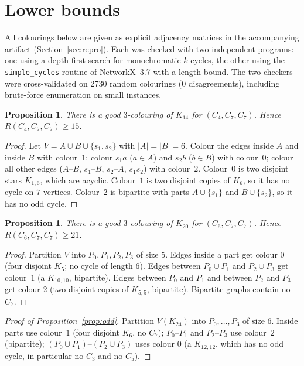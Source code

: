 \documentclass[11pt]{amsart}
\newtheorem{proposition}[theorem]{Proposition}
\theoremstyle{definition}
\theoremstyle{remark}
\begin{document}
\section{Lower bounds}\label{sec:lower}

All colourings below are given as explicit adjacency matrices in the accompanying artifact (Section~\ref{sec:repro}). Each was
checked with two independent programs: one using a depth-first search for monochromatic $k$-cycles, the other using the
\texttt{simple\_cycles} routine of NetworkX~3.7 with a length bound. The two checkers were cross-validated on 2730 random colourings
(0 disagreements), including brute-force enumeration on small instances.

\begin{proposition}\label{prop:lb4}
There is a good $3$-colouring of $K_{14}$ for $(C_4,C_7,C_7)$. Hence $R(C_4,C_7,C_7)\ge15$.
\end{proposition}
\begin{proof}
Let $V=A\cup B\cup\{s_1,s_2\}$ with $|A|=|B|=6$. Colour the edges inside $A$ and inside $B$ with colour~$1$; colour $s_1a$ ($a\in A$)
and $s_2b$ ($b\in B$) with colour~$0$; colour all other edges ($A$--$B$, $s_1$--$B$, $s_2$--$A$, $s_1s_2$) with colour~$2$.
Colour~$0$ is two disjoint stars $K_{1,6}$, which are acyclic. Colour~$1$ is two disjoint copies of $K_6$, so it has no cycle on $7$
vertices. Colour~$2$ is bipartite with parts $A\cup\{s_1\}$ and $B\cup\{s_2\}$, so it has no odd cycle.
\end{proof}

\begin{proposition}\label{prop:lb6}
There is a good $3$-colouring of $K_{20}$ for $(C_6,C_7,C_7)$. Hence $R(C_6,C_7,C_7)\ge21$.
\end{proposition}
\begin{proof}
Partition $V$ into $P_0,P_1,P_2,P_3$ of size $5$. Edges inside a part get colour $0$ (four disjoint $K_5$; no cycle of length
$6$). Edges between $P_0\cup P_1$ and $P_2\cup P_3$ get colour~$1$ (a $K_{10,10}$, bipartite). Edges between $P_0$ and $P_1$ and between $P_2$
and $P_3$ get colour $2$ (two disjoint copies of $K_{5,5}$, bipartite). Bipartite graphs contain no $C_7$.
\end{proof}

\begin{proof}[Proof of Proposition~\ref{prop:odd}]
Partition $V(K_{24})$ into $P_0,\dots,P_3$ of size $6$. Inside parts use colour~$1$ (four disjoint $K_6$, no $C_7$);
$P_0$--$P_1$ and $P_2$--$P_3$ use colour~$2$ (bipartite); $(P_0\cup P_1)$--$(P_2\cup P_3)$ uses colour $0$ (a $K_{12,12}$, which has
no odd cycle, in particular no $C_3$ and no $C_5$).
\end{proof}
\end{document}
